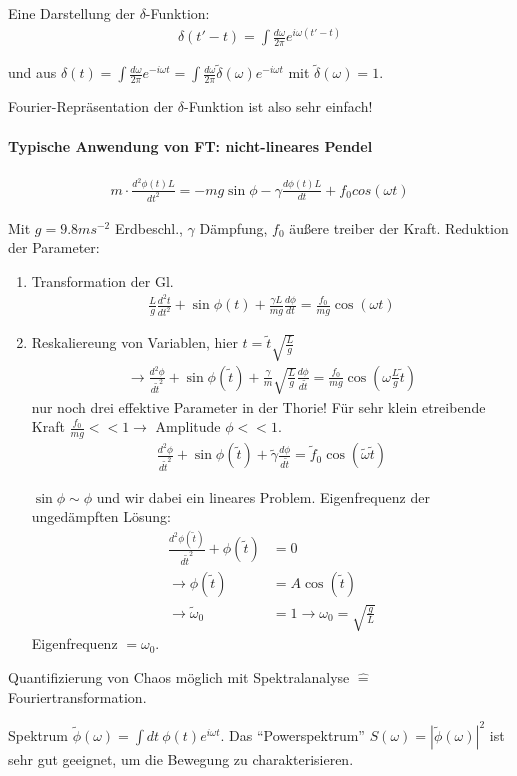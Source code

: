 \documentclass[a4paper,ngerman]{scrbook}
\begin{document}
Eine Darstellung der $\delta$-Funktion:
\begin{align*}
  \delta(t'-t) = \int\frac{d\omega}{2\pi} e^{i\omega(t'-t)}
\end{align*}

und aus $\delta(t) = \int\frac{d\omega}{2\pi} e^{-i\omega t} = \int\frac{d\omega}{2\pi} \tilde{\delta}(\omega) e^{-i\omega t}$ mit $\tilde\delta(\omega) = 1$.

Fourier-Repräsentation der $\delta$-Funktion ist also sehr einfach!

\paragraph{Typische Anwendung von FT: nicht-lineares Pendel}

\begin{align*}
  m\cdot\frac{d^2\phi(t)L}{dt^2} = -mg\sin\phi - \gamma \frac{d\phi(t)L}{dt} + f_0 cos(\omega t)
\end{align*}

Mit $g = 9.8ms^{-2}$ Erdbeschl\@., $\gamma$ Dämpfung, $f_0$ äußere treiber der Kraft. Reduktion der Parameter:
\begin{enumerate}
\item Transformation der Gl\@.
  \begin{align*}
    \frac{L}{g} \frac{d^2t}{dt^2} + \sin\phi(t) + \frac{\gamma L}{mg} \frac{d\phi}{dt} = \frac{f_0}{mg}\cos(\omega t)
  \end{align*}
\item Reskaliereung von Variablen, hier $t=\tilde{t}\sqrt{\frac{L}{g}}$
  \begin{align*}
    \to \frac{d^2\phi}{d\tilde{t}^2} + \sin\phi(\tilde{t}) + \frac{\gamma}{m} \sqrt{\frac{L}{g}} \frac{d\phi}{d\tilde{t}} = \frac{f_0}{mg} \cos\left(\omega\frac{L}{g} \tilde{t}\right)
  \end{align*}
  nur noch drei effektive Parameter in der Thorie! Für sehr klein   etreibende Kraft $\frac{f_0}{mg} << 1 \to$ Amplitude $\phi << 1$.
  \begin{align*}
    \frac{d^2\phi}{d\tilde{t}^2} + \sin\phi(\tilde{t}) + \tilde\gamma \frac{d\phi}{d\tilde{t}} = \tilde{f}_0 \cos\left(\tilde{\omega} \tilde{t}\right)
  \end{align*}

$\sin\phi\sim\phi$ und wir dabei ein lineares Problem. Eigenfrequenz der ungedämpften Lösung:
\begin{align*}
  \frac{d^2 \phi(\tilde{t})}{d\tilde{t}^2} + \phi(\tilde{t}) &= 0\\
  \to \phi(\tilde{t}) &= A\cos(\tilde{t})\\
  \to \tilde{\omega}_0 &= 1 \to \omega_0 = \sqrt{\frac{g}{L}}
\end{align*}
Eigenfrequenz $= \omega_0$.
\end{enumerate}

Quantifizierung von Chaos möglich mit Spektralanalyse $\hat{=}$ Fouriertransformation.

Spektrum $\tilde\phi(\omega) = \int\!dt\ \phi(t) e^{i\omega t}$. Das "`Powerspektrum"' $S(\omega) = |\tilde\phi(\omega)|^2$ ist sehr gut geeignet, um die Bewegung zu charakterisieren.
\end{document}
